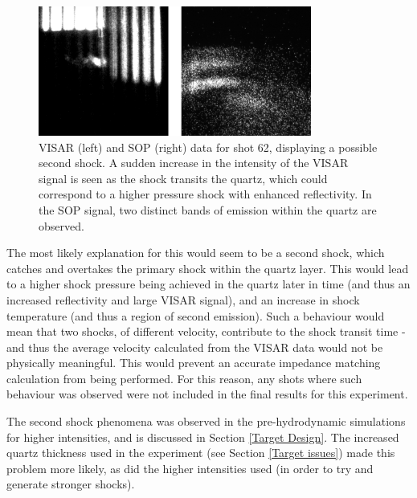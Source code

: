 \begin{figure} [h]
\begin{centering}
\includegraphics[width=0.8\textwidth]{figures/Experiment/Second Shock.png}%
\caption{\label{fig:Second Shock} VISAR (left) and SOP (right) data for shot 62, displaying a possible second shock. A sudden increase in the intensity of the VISAR signal is seen as the shock transits the quartz, which could correspond to a higher pressure shock with enhanced reflectivity. In the SOP signal, two distinct bands of emission within the quartz are observed.}
\end{centering}
\end{figure}

The most likely explanation for this would seem to be a second shock, which catches and overtakes the primary shock within the quartz layer. This would lead to a higher shock pressure being achieved in the quartz later in time (and thus an increased reflectivity and large VISAR signal), and an increase in shock temperature (and thus a region of second emission). Such a behaviour would mean that two shocks, of different velocity, contribute to the shock transit time - and thus the average velocity calculated from the VISAR data would not be physically meaningful. This would prevent an accurate impedance matching calculation from being performed. For this reason, any shots where such behaviour was observed were not included in the final results for this experiment.

The second shock phenomena was observed in the pre-hydrodynamic simulations for higher intensities, and is discussed in Section \ref{Target Design}. The increased quartz thickness used in the experiment (see Section \ref{Target issues}) made this problem more likely, as did the higher intensities used (in order to try and generate stronger shocks). 

